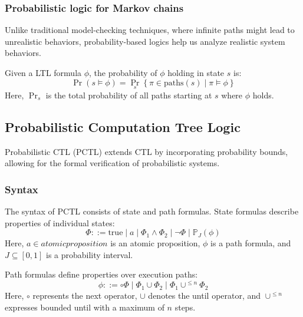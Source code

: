 \subsubsection{Probabilistic logic for Markov chains}
Unlike traditional model-checking techniques, where infinite paths might lead to unrealistic behaviors, probability-based logics help us analyze realistic system behaviors.

Given a LTL formula $\phi$, the probability of $\phi$ holding in state $s$ is:
\[\Pr(s\models\phi)=\Pr_s\left\{\pi\in\text{paths}(s)\mid\pi\models\phi\right\}\]
Here, $\Pr_s$ is the total probability of all paths starting at $s$ where $\phi$ holds.

\subsection{Probabilistic Computation Tree Logic}
Probabilistic CTL (PCTL) extends CTL by incorporating probability bounds, allowing for the formal verification of probabilistic systems.

\subsubsection{Syntax}
The syntax of PCTL consists of state and path formulas. 
State formulas describe properties of individual states:
\[\Phi::=\text{true}\mid a\mid \Phi_1\land\Phi_2\mid\lnot\Phi\mid\mathbb{P}_J(\phi)\]
\noindent Here, $a \in atomic proposition$ is an atomic proposition, $\phi$ is a path formula, and $J \subseteq [0, 1]$ is a probability interval.

Path formulas define properties over execution paths:
\[\phi::=\circ\Phi\mid\Phi_1\cup\Phi_2\mid\Phi_1\cup^{\leq n}\Phi_2\]
\noindent Here, $\circ$ represents the next operator, $\cup$ denotes the until operator, and $\cup^{\leq n}$ expresses bounded until with a maximum of $n$ steps.

